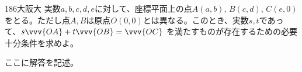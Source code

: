 \begin{prob}{186}{}{大阪大}
 実数$a, b, c, d, e$に対して、座標平面上の点$A(a,b)$, $B(c,d)$, $C(e,0)$ をとる。ただし点$A, B$は原点$O(0,0)$とは異なる。このとき、実数$s, t$であって、$s\vvv{OA}+t\vvv{OB}=\vvv{OC}$ を満たすものが存在するための必要十分条件を求めよ。
\end{prob}

ここに解答を記述。